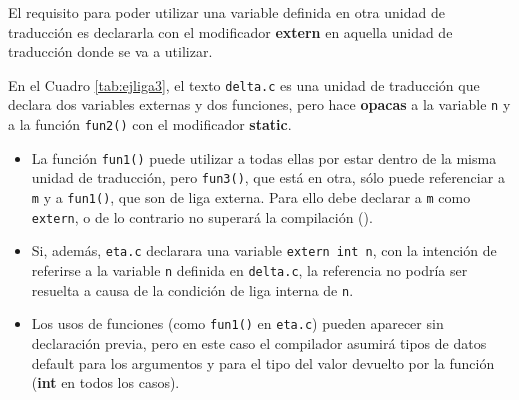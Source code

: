 El requisito para poder utilizar una variable definida en otra unidad de traducción es declararla con el
modificador \textbf{extern} en aquella unidad de traducción donde se va a utilizar.


\begin{ejemplo}
En el Cuadro \ref{tab:ejliga3}, el texto \lstinline{delta.c} es una unidad de traducción que declara dos variables externas y dos funciones, pero
hace \textbf{opacas} a la variable \lstinline{n} y a la función \lstinline{fun2()} con el modificador \textbf{static}. 
\begin{itemize}
\item La función \lstinline{fun1()} puede
utilizar a todas ellas por estar dentro de la misma unidad de traducción, pero \lstinline{fun3()}, que está en otra,
sólo puede referenciar a \lstinline{m} y a \lstinline{fun1()}, que son de liga externa. Para ello debe declarar a \lstinline{m} como
\lstinline{extern}, o de lo contrario no superará la compilación (\textit{}).
\item Si, además, \lstinline{eta.c} declarara una variable \lstinline{extern int n}, con la intención de referirse a la variable \lstinline{n} definida en \lstinline{delta.c}, la referencia no podría ser resuelta a causa de la condición de liga interna de \lstinline{n}. 


\item Los usos de funciones (como \lstinline{fun1()} en \lstinline{eta.c}) pueden aparecer sin declaración previa, pero en este caso
el compilador asumirá tipos de datos default para los argumentos y para el tipo del valor devuelto por
la función (\textbf{int} en todos los casos).
\end{itemize}


\begin{comment}
\begin{table}
\centering	
\begin{tabular}{l|l}
\hline
delta.c & eta.c \\
\hline
\begin{codecell}
int m;
static int n;
int fun1()
{
	n=fun2();
	...
}
static int fun2()
{
	...
}
\end{codecell}
&
\begin{codecell}
extern int m;
int fun3()
{
	m=fun1();
}

\end{codecell}
\\
\end{tabular}
 \caption{Liga de las variables}
 \label{tab:ejliga3} 
\end{table}
\end{comment}
\end{ejemplo}







